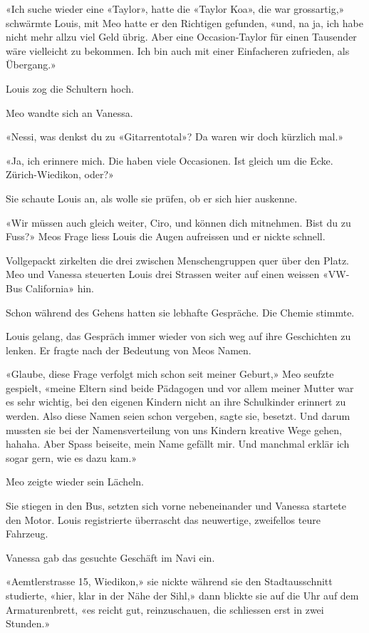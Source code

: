 «Ich suche wieder eine «Taylor», hatte die «Taylor Koa», die war
grossartig,» schwärmte Louis, mit Meo hatte er den Richtigen gefunden,
«und, na ja, ich habe nicht mehr allzu viel Geld übrig. Aber eine
Occasion-Taylor für einen Tausender wäre vielleicht zu bekommen. Ich bin
auch mit einer Einfacheren zufrieden, als Übergang.»

Louis zog die Schultern hoch.

Meo wandte sich an Vanessa.

«Nessi, was denkst du zu «Gitarrentotal»? Da waren wir doch kürzlich
mal.»

«Ja, ich erinnere mich. Die haben viele Occasionen. Ist gleich um die
Ecke. Zürich-Wiedikon, oder?»

Sie schaute Louis an, als wolle sie prüfen, ob er sich hier auskenne.

«Wir müssen auch gleich weiter, Ciro, und können dich mitnehmen. Bist du
zu Fuss?» Meos Frage liess Louis die Augen aufreissen und er nickte
schnell.

Vollgepackt zirkelten die drei zwischen Menschengruppen quer über den
Platz. Meo und Vanessa steuerten Louis drei Strassen weiter auf einen
weissen «VW-Bus California» hin.

Schon während des Gehens hatten sie lebhafte Gespräche. Die Chemie
stimmte.

Louis gelang, das Gespräch immer wieder von sich weg auf ihre
Geschichten zu lenken. Er fragte nach der Bedeutung von Meos Namen.

«Glaube, diese Frage verfolgt mich schon seit meiner Geburt,» Meo
seufzte gespielt, «meine Eltern sind beide Pädagogen und vor allem
meiner Mutter war es sehr wichtig, bei den eigenen Kindern nicht an ihre
Schulkinder erinnert zu werden. Also diese Namen seien schon vergeben,
sagte sie, besetzt. Und darum mussten sie bei der Namensverteilung von
uns Kindern kreative Wege gehen, hahaha. Aber Spass beiseite, mein Name
gefällt mir. Und manchmal erklär ich sogar gern, wie es dazu kam.»

Meo zeigte wieder sein Lächeln.

Sie stiegen in den Bus, setzten sich vorne nebeneinander und Vanessa
startete den Motor. Louis registrierte überrascht das neuwertige,
zweifellos teure Fahrzeug.

Vanessa gab das gesuchte Geschäft im Navi ein.

«Aemtlerstrasse 15, Wiedikon,» sie nickte während sie den
Stadtausschnitt studierte, «hier, klar in der Nähe der Sihl,» dann
blickte sie auf die Uhr auf dem Armaturenbrett, «es reicht gut,
reinzuschauen, die schliessen erst in zwei Stunden.»

